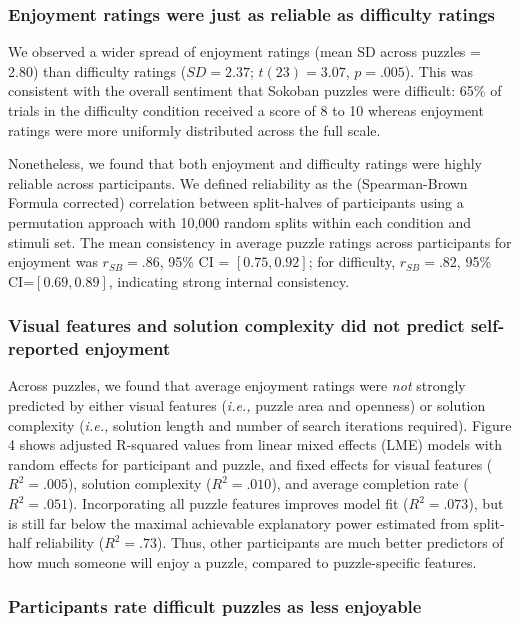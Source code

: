 \documentclass[10pt,letterpaper]{article}
\begin{document}
\subsubsection{Enjoyment ratings were just as reliable as difficulty ratings}

We observed a wider spread of enjoyment ratings (mean SD across puzzles = 2.80) than difficulty ratings ($SD=2.37$; $t(23)=3.07$, $p=.005$). This was consistent with the overall sentiment that Sokoban puzzles were difficult: 65\% of trials in the difficulty condition received a score of 8 to 10 whereas enjoyment ratings were more uniformly distributed across the full scale.

Nonetheless, we found that both enjoyment and difficulty ratings were highly reliable across participants. We defined reliability as the (Spearman-Brown Formula corrected) correlation between split-halves of participants using a permutation approach \cite{parsons2021splithalf} with 10,000 random splits within each condition and stimuli set. The mean consistency in average puzzle ratings across participants for enjoyment was $r_{SB}=.86$, 95\% CI = $[0.75, 0.92]$; for difficulty, $r_{SB}=.82$, 95\% CI=$[0.69, 0.89]$, indicating strong internal consistency.

\subsubsection{Visual features and solution complexity did not predict self-reported enjoyment}
Across puzzles, we found that average enjoyment ratings were \textit{not} strongly predicted by either visual features (\textit{i.e., }puzzle area and openness) or solution complexity (\textit{i.e., }solution length and number of search iterations required). Figure 4 shows adjusted R-squared values from linear mixed effects (LME) models with random effects for participant and puzzle, and fixed effects for visual features ($R^2= .005$), solution complexity ($R^2= .010$), and average completion rate ($R^2=.051$). Incorporating all puzzle features improves model fit ($R^2= .073$), but is still far below the maximal achievable explanatory power estimated from split-half reliability ($R^2=.73$). Thus, other participants are much better predictors of how much someone will enjoy a puzzle, compared to puzzle-specific features.

\subsubsection{Participants rate difficult puzzles as less enjoyable}
\end{document}

